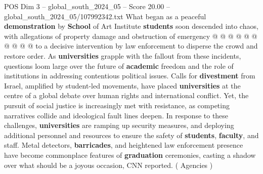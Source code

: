 \begin{textsample}{POS Dim 3 – global\_south\_2024\_05 – Score 20.00 – global\_south\_2024\_05/107992342.txt}
What began as a peaceful \textbf{demonstration} by \textbf{School} of Art Institute \textbf{students} soon descended into chaos, with allegations of property damage and obstruction of emergency @ @ @ @ @ @ @ @ @ @ to a decisive intervention by law enforcement to disperse the crowd and restore order.
As \textbf{universities} grapple with the fallout from these incidents, questions loom large over the future of \textbf{academic} freedom and the role of institutions in addressing contentious political issues.
Calls for \textbf{divestment} from Israel, amplified by student-led movements, have placed \textbf{universities} at the centre of a global debate over human rights and international conflict.
Yet, the pursuit of social justice is increasingly met with resistance, as competing narratives collide and ideological fault lines deepen.
In response to these challenges, \textbf{universities} are ramping up security measures, and deploying additional personnel and resources to ensure the safety of \textbf{students}, \textbf{faculty}, and staff.
Metal detectors, \textbf{barricades}, and heightened law enforcement presence have become commonplace features of \textbf{graduation} ceremonies, casting a shadow over what should be a joyous occasion, CNN reported. ( Agencies )

\end{textsample}
